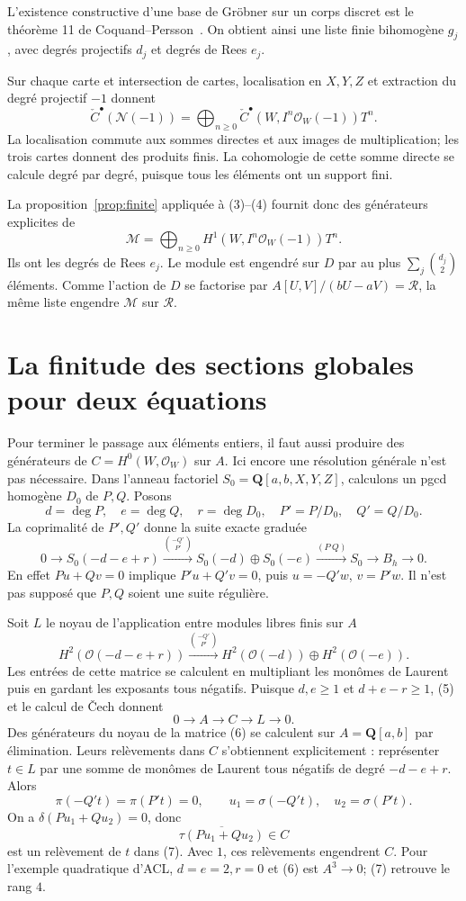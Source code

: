 \documentclass[11pt]{amsart}
\theoremstyle{remark}
\newcommand{\OO}{\mathcal O}
\begin{document}
L'existence constructive d'une base de Gröbner sur un corps discret
est le théorème 11 de Coquand--Persson~\cite{CP}.
On obtient ainsi une liste finie bihomogène $g_j$, avec degrés
projectifs $d_j$ et degrés de Rees $e_j$.

Sur chaque carte et intersection de cartes, localisation en $X,Y,Z$
et extraction du degré projectif $-1$ donnent
\[
 \check C^\bullet(\mathcal N(-1))
  =\bigoplus_{n\geq0}\check C^\bullet(W,I^n\OO_W(-1))T^n.
 \tag{4}
\]
La localisation commute aux sommes directes et aux images de
multiplication; les trois cartes donnent des produits finis.
La cohomologie de cette somme directe se calcule degré par degré,
puisque tous les éléments ont un support fini.

La proposition~\ref{prop:finite} appliquée à (3)--(4) fournit donc
des générateurs explicites de
\[
 \mathcal M=\bigoplus_{n\geq0}H^1(W,I^n\OO_W(-1))T^n.
\]
Ils ont les degrés de Rees $e_j$. Le module est engendré sur $D$
par au plus $\sum_j\binom{d_j}{2}$ éléments. Comme l'action de $D$
se factorise par $A[U,V]/(bU-aV)=\mathcal R$, la même liste engendre
$\mathcal M$ sur $\mathcal R$.

\section{La finitude des sections globales pour deux équations}

Pour terminer le passage aux éléments entiers, il faut aussi produire
des générateurs de $C=H^0(W,\OO_W)$ sur $A$.
Ici encore une résolution générale n'est pas nécessaire.
Dans l'anneau factoriel $S_0=\mathbf Q[a,b,X,Y,Z]$, calculons un
pgcd homogène $D_0$ de $P,Q$. Posons
\[
 d=\deg P,\quad e=\deg Q,\quad r=\deg D_0,
 \quad P'=P/D_0,\quad Q'=Q/D_0.
\]
La coprimalité de $P',Q'$ donne la suite exacte graduée
\[
 0\longrightarrow S_0(-d-e+r)
 \xrightarrow{\binom{-Q'}{P'}} S_0(-d)\oplus S_0(-e)
 \xrightarrow{(P\ Q)} S_0
 \longrightarrow B_h\longrightarrow0.
 \tag{5}
\]
En effet $Pu+Qv=0$ implique $P'u+Q'v=0$, puis
$u=-Q'w$, $v=P'w$. Il n'est pas supposé que $P,Q$ soient une suite
régulière.

Soit $L$ le noyau de l'application entre modules libres finis sur $A$
\[
 H^2(\OO(-d-e+r))
   \xrightarrow{\binom{-Q'}{P'}}
 H^2(\OO(-d))\oplus H^2(\OO(-e)).
 \tag{6}
\]
Les entrées de cette matrice se calculent en multipliant les monômes
de Laurent puis en gardant les exposants tous négatifs.
Puisque $d,e\geq1$ et $d+e-r\geq1$, (5) et le calcul de Čech donnent
\[
 0\longrightarrow A\longrightarrow C\longrightarrow L\longrightarrow0.
 \tag{7}
\]
Des générateurs du noyau de la matrice (6) se calculent sur
$A=\mathbf Q[a,b]$ par élimination. Leurs relèvements dans $C$
s'obtiennent explicitement : représenter $t\in L$ par une somme
de monômes de Laurent tous négatifs de degré $-d-e+r$. Alors
\[
 \pi(-Q't)=\pi(P't)=0,\qquad
 u_1=\sigma(-Q't),\quad u_2=\sigma(P't).
\]
On a $\delta(Pu_1+Qu_2)=0$, donc
\[
 \overline{\tau(Pu_1+Qu_2)}\in C
\]
est un relèvement de $t$ dans (7). Avec $1$, ces relèvements
engendrent $C$. Pour l'exemple quadratique d'ACL,
$d=e=2,r=0$ et (6) est $A^3\to0$; (7) retrouve le rang $4$.
\end{document}
